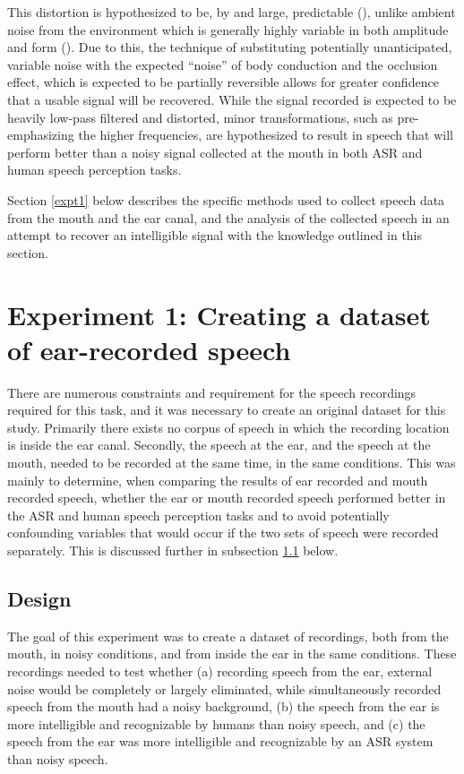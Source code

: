 \documentclass[dissertation,copyright]{uathesis}
\begin{document}
This distortion is hypothesized to be, by and large, predictable (\cite{reinfeldt:10}), unlike ambient noise from the environment which is generally highly variable in both amplitude and form (\cite{zhang:17}).  Due to this, the technique of substituting potentially unanticipated, variable noise with the expected ``noise'' of body conduction and the occlusion effect, which is expected to be partially reversible allows for greater confidence that a usable signal will be recovered.  While the signal recorded is expected to be heavily low-pass filtered and distorted, minor transformations, such as pre-emphasizing the higher frequencies, are hypothesized to result in speech that will perform better than a noisy signal collected at the mouth in both ASR and human speech perception tasks.  

Section \ref{expt1} below describes the specific methods used to collect speech data from the mouth and the ear canal, and the analysis of the collected speech in an attempt to recover an intelligible signal with the knowledge outlined in this section.


\section{Experiment 1: Creating a dataset of ear-recorded speech\label{expt1}}

There are numerous constraints and requirement for the speech recordings required for this task, and it was necessary to create an original dataset for this study.  Primarily there exists no corpus of speech in which the recording location is inside the ear canal.  Secondly, the speech at the ear, and the speech at the mouth, needed to be recorded at the same time, in the same conditions.  This was mainly to determine, when comparing the results of ear recorded and mouth recorded speech, whether the ear or mouth recorded speech performed better in the ASR and human speech perception tasks and to avoid potentially confounding variables that would occur if the two sets of speech were recorded separately. This is discussed further in subsection \ref{exp1design} below.

\subsection{Design}
\label{exp1design}
   
The goal of this experiment was to create a dataset of recordings, both from the mouth, in noisy conditions, and from inside the ear in the same conditions.  These recordings needed to test whether (a) recording speech from the ear, external noise would be completely or largely eliminated, while simultaneously recorded speech from the mouth had a noisy background, (b) the speech from the ear is more intelligible and recognizable by humans than noisy speech, and (c) the speech from the ear was more intelligible and recognizable by an ASR system than noisy speech. 
\end{document}
